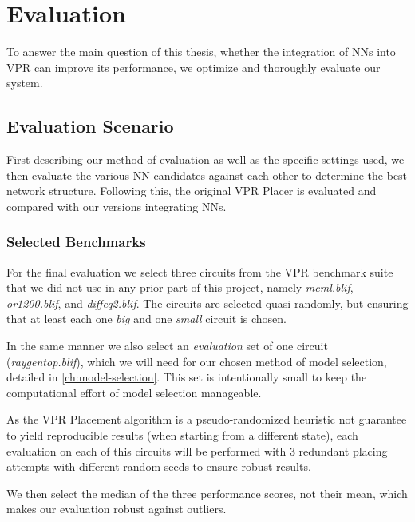 
\chapter{Evaluation}\label{ch:evaluation}
\glsresetall %

To answer the main question of this thesis, whether the integration of \glspl{NN} into \gls{VPR} can improve its performance, we optimize and thoroughly evaluate our system.

\section{Evaluation Scenario}

First describing our method of evaluation as well as the specific settings used, we then evaluate the various \gls{NN} candidates against each other to determine the best network structure. Following this, the original \gls{VPR} Placer is evaluated and compared with our versions integrating \glspl{NN}.

\subsection{Selected Benchmarks}\label{ch:benchmarks}

For the final evaluation we select three circuits from the \gls{VPR} benchmark suite that we did not use in any prior part of this project, namely \textit{mcml.blif}, \textit{or1200.blif}, and \textit{diffeq2.blif}. The circuits are selected quasi-randomly, but ensuring that at least each one \textit{big} and one \textit{small} circuit is chosen.

In the same manner we also select an \textit{evaluation} set of one circuit (\textit{raygentop.blif}), which we will need for our chosen method of model selection, detailed in \ref{ch:model-selection}. This set is intentionally small to keep the computational effort of model selection manageable.

As the \gls{VPR} Placement algorithm is a pseudo-randomized heuristic not guarantee to yield reproducible results (when starting from a different state), each evaluation on each of this circuits will be performed with 3 redundant placing attempts with different random seeds to ensure robust results. 

We then select the median of the three performance scores, not their mean, which makes our evaluation robust against outliers.

